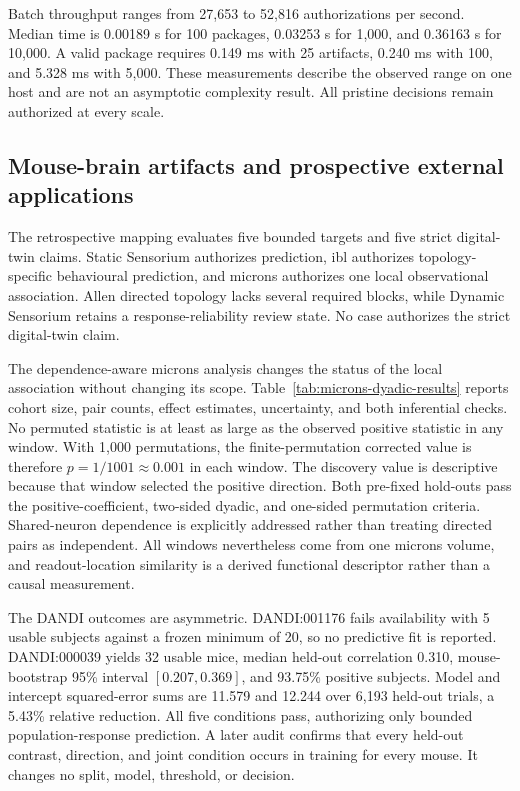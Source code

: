 Batch throughput ranges from 27,653 to 52,816 authorizations per second. Median time is 0.00189 s for 100 packages, 0.03253 s for 1,000, and 0.36163 s for 10,000. A valid package requires 0.149 ms with 25 artifacts, 0.240 ms with 100, and 5.328 ms with 5,000. These measurements describe the observed range on one host and are not an asymptotic complexity result. All pristine decisions remain authorized at every scale.





\FloatBarrier

\subsection{Mouse-brain artifacts and prospective external applications}
\label{subsec:application-results}

The retrospective mapping evaluates five bounded targets and five strict digital-twin claims. Static Sensorium authorizes prediction, \ac{ibl} authorizes topology-specific behavioural prediction, and \ac{microns} authorizes one local observational association. Allen directed topology lacks several required blocks, while Dynamic Sensorium retains a response-reliability review state. No case authorizes the strict digital-twin claim.

The dependence-aware \ac{microns} analysis changes the status of the local association without changing its scope. Table~\ref{tab:microns-dyadic-results} reports cohort size, pair counts, effect estimates, uncertainty, and both inferential checks. No permuted statistic is at least as large as the observed positive statistic in any window. With 1,000 permutations, the finite-permutation corrected value is therefore $p=1/1001\approx0.001$ in each window. The discovery value is descriptive because that window selected the positive direction. Both pre-fixed hold-outs pass the positive-coefficient, two-sided dyadic, and one-sided permutation criteria. Shared-neuron dependence is explicitly addressed rather than treating directed pairs as independent. All windows nevertheless come from one \ac{microns} volume, and readout-location similarity is a derived functional descriptor rather than a causal measurement.



The DANDI outcomes are asymmetric. DANDI:001176 fails availability with 5 usable subjects against a frozen minimum of 20, so no predictive fit is reported. DANDI:000039 yields 32 usable mice, median held-out correlation 0.310, mouse-bootstrap 95\% interval $[0.207,0.369]$, and 93.75\% positive subjects. Model and intercept squared-error sums are 11.579 and 12.244 over 6,193 held-out trials, a 5.43\% relative reduction. All five conditions pass, authorizing only bounded population-response prediction. A later audit confirms that every held-out contrast, direction, and joint condition occurs in training for every mouse. It changes no split, model, threshold, or decision.

